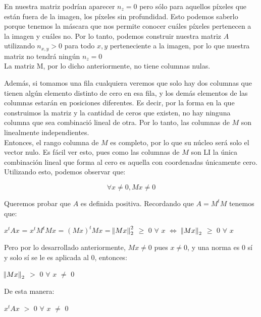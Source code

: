 En nuestra matriz podrían aparecer $n_z = 0$ pero sólo para aquellos píxeles que están fuera de la imagen, los píxeles sin profundidad. Esto podemos saberlo porque tenemos la máscara que nos permite conocer cuáles píxeles pertenecen a la imagen y cuáles no. Por lo tanto, podemos construir nuestra matriz $A$ utilizando $n_{x, y} > 0$ para todo $x, y$ perteneciente a la imagen, por lo que nuestra matriz no tendrá ningún $n_z = 0$ \\

La matriz M, por lo dicho anteriormente, no tiene columnas nulas.

Además, si tomamos una fila cualquiera veremos que solo hay dos columnas que tienen algún elemento distinto de cero en esa fila, y los demás elementos de las columnas estarán en posiciones diferentes. Es decir, por la forma en la que construimos la matriz y la cantidad de ceros que existen, no hay ninguna columna que sea combinació lineal de otra. Por lo tanto, las columnas de $M$ son linealmente independientes. \\

Entonces, el rango columna de $M$ es completo, por lo que su núcleo será solo el vector nulo. Es fácil ver esto, pues como las columnas de $M$ son LI la única combinación lineal que forma al cero es aquella con coordenadas únicamente cero. Utilizando esto, podemos observar que:

$$\forall x \neq 0,    Mx \neq 0 $$

Queremos probar que $A$ es definida positiva. Recordando que $A = M^t M$ tenemos que: \\

\begin{center}
$x^{t}$$A$$x$ = $x^{t}$$M^{t}$$M$$x$ = $(Mx)^{t}$$M$$x$ = $\norm{Mx}^2_{2}$ $\geq$ $0$ $\forall$ $x$
$\iff$ $\norm{Mx}_{2}$ $\geq$ $0$ $\forall$ $x$
\end{center}


Pero por lo desarrollado anteriormente, $Mx \neq 0$ pues $x \neq 0$, y una norma es $0$ sí y solo sí se le es aplicada al $0$, entonces:

\begin{center}
$\norm{Mx}_{2}$ $>$ $0$ $\forall$ $x$ $\not=$ $0$
\end{center}

De esta manera:
\begin{center}
$x^{t}$$A$$x$ $>$ $0$ $\forall$ $x$ $\not=$ $0$
\end{center}

